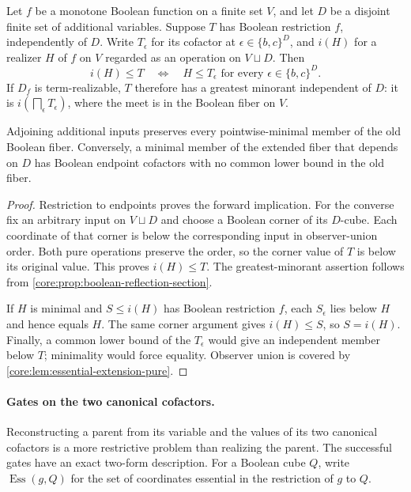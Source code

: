 \begin{proposition}
\label{core:prop:boolean-independent-minorants}
Let $f$ be a monotone Boolean function on a finite set $V$, and let $D$
be a disjoint finite set of additional variables. Suppose $T$ has Boolean restriction
$f$, independently of $D$. Write $T_\epsilon$ for its cofactor at
$\epsilon\in\{b,c\}^D$, and $i(H)$ for a realizer $H$ of $f$ on $V$
regarded as an operation on $V\sqcup D$. Then
\[
 i(H)\leq T
 \quad\Longleftrightarrow\quad
 H\leq T_\epsilon\text{ for every }\epsilon\in\{b,c\}^D.
\]
If $D_f$ is term-realizable, $T$ therefore has a greatest minorant
independent of $D$: it is $i(\mathop{\bigsqcap}_\epsilon T_\epsilon)$,
where the meet is in the Boolean fiber on $V$.

Adjoining additional inputs preserves every pointwise-minimal member
of the old Boolean fiber. Conversely, a minimal member of the extended
fiber that depends on $D$ has Boolean endpoint cofactors with no common
lower bound in the old fiber.
\end{proposition}
\begin{proof}
Restriction to endpoints proves the forward implication.
For the converse fix an arbitrary input on $V\sqcup D$ and choose a
Boolean corner of its $D$-cube. Each coordinate of that corner is below
the corresponding input in observer-union order. Both pure operations
preserve the order, so the corner value of $T$ is below its original
value. This proves $i(H)\leq T$. The greatest-minorant assertion follows
from \cref{core:prop:boolean-reflection-section}.

If $H$ is minimal and $S\leq i(H)$ has Boolean restriction $f$, each
$S_\epsilon$ lies below $H$ and hence equals $H$. The same corner
argument gives $i(H)\leq S$, so $S=i(H)$. Finally, a common lower bound
of the $T_\epsilon$ would give an independent member below $T$; minimality
would force equality. Observer union is covered by
\cref{core:lem:essential-extension-pure}.
\end{proof}

\paragraph{Gates on the two canonical cofactors.}
Reconstructing a parent from its variable and the values of its two
canonical cofactors is a more restrictive problem than realizing the
parent. The successful gates have an exact two-form description.
For a Boolean cube $Q$, write $\operatorname{Ess}(g,Q)$ for the set
of coordinates essential in the restriction of $g$ to $Q$.


